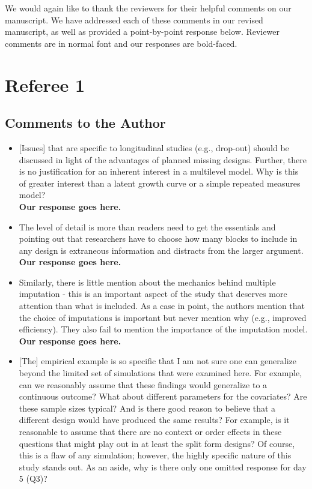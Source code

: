 \documentclass[letterpaper,12pt]{article}\usepackage[]{graphicx}\usepackage[]{color}
\begin{document}
 We would again like to thank the reviewers for their helpful comments on our manuscript.  We have addressed each of these comments in our revised manuscript, as well as provided a point-by-point response below. Reviewer comments are in normal font and our responses are bold-faced.  


\section{Referee 1}
\subsection{Comments to the Author}
\begin{itemize}

\item {[Issues]} that are specific to longitudinal studies (e.g., drop-out) should be discussed in light of the advantages of planned missing designs. Further, there is no justification for an inherent interest in a multilevel model. Why is this of greater interest than a latent growth curve or a simple repeated measures model?\\

{\bf Our response goes here.}\\

\item  The level of detail is more than readers need to get the essentials and pointing out that researchers have to choose how many blocks to include in any design is extraneous information and distracts from the larger argument.\\

{\bf Our response goes here.}\\

\item Similarly, there is little mention about the mechanics behind multiple imputation - this is an important aspect of the study that deserves more attention than what is included. As a case in point, the authors mention that the choice of imputations is important but never mention why (e.g., improved efficiency). They also fail to mention the importance of the imputation model.\\

{\bf Our response goes here.}\\

\item {[The]} empirical example is so specific that I am not sure one can generalize beyond the limited set of simulations that were examined here.  For example, can we reasonably assume that these findings would generalize to a continuous outcome? What about different parameters for the covariates? Are these sample sizes typical? And is there good reason to believe that a different design would have produced the same results? For example, is it reasonable to assume that there are no context or order effects in these questions that might play out in at least the split form designs?  Of course, this is a flaw of any simulation; however, the highly specific nature of this study stands out. As an aside, why is there only one omitted response for day 5 (Q3)?\\


\end{itemize}
\end{document}
